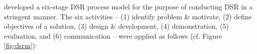 \begin{comment}
	\begin{table}[t]
		\caption[Design Science Research Guidelines]{Design Science Research Guidelines adapted from \citet[p. 83]{Hevner2007}}
		\label{tab:dsrg}
		\centering
		\begin{tabular}{L{.25\textwidth}L{.65\textwidth}}
				\toprule 
				\small \textbf{Guideline} &\small  \textbf{Description} \\ \midrule
				\small G1: Design as an Artifact & 
				\small Design-science research must produce a viable artifact in the form of a construct, a model, a method, or an instantiation.\\ \midrule
				\small G2: Problem Relevance&
				\small The objective of design-science research is to develop technology-based solutions to important and relevant business problems.\\ \midrule
				\small G3: Design Evaluation&
				\small The utility, quality, and efficacy of a design artifact must be rigorously demonstrated via well-executed evaluation methods.\\ \midrule
				\small G4: Research Contributions&
				\small Effective design-science research must provide clear and verifiable contributions in the areas of the design artifact, design foundations, and/or design methodologies.\\ \midrule
				\small G5: Research Rigor&
				\small Design-science research relies upon the application of rigorous methods in both the construction and evaluation of the design artifact.\\ \midrule
				\small G6: Design as a Search Process&
				\small The search for an effective artifact requires utilizing available means to reach desired ends while satisfying laws in the problem environment.\\ \midrule
				\small G7: Communication of Research&
				\small Design-science research must be presented effectively both to technology-oriented as well as management-oriented audiences.\\ \bottomrule
		\end{tabular}
	\end{table}
\end{comment}

\citet[pp. 52-56]{Peffers2007} developed a six-stage \ac{DSR} process model for the purpose of conducting \ac{DSR} in a stringent manner. The six activities -- (1) identify problem \& motivate, (2) define objectives of a solution, (3) design \& development, (4) demonstration, (5) evaluation, and (6) communication -- were applied as follows (cf. Figure \ref{fig:dsrm}):

